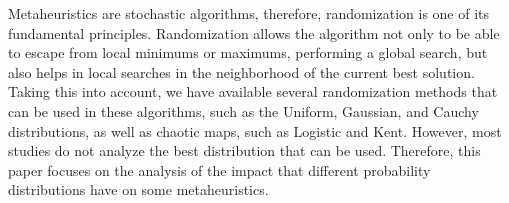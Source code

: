 Metaheuristics are stochastic algorithms, therefore, randomization is one of its fundamental principles. Randomization allows the algorithm not only to be able to escape from local minimums or maximums, performing a global search, but also helps in local searches in the neighborhood of the current best solution. Taking this into account, we have available several randomization methods that can be used in these algorithms, such as the Uniform, Gaussian, and Cauchy distributions, as well as chaotic maps, such as Logistic and Kent. However, most studies do not analyze the best distribution that can be used. Therefore, this paper focuses on the analysis of the impact that different probability distributions have on some metaheuristics.